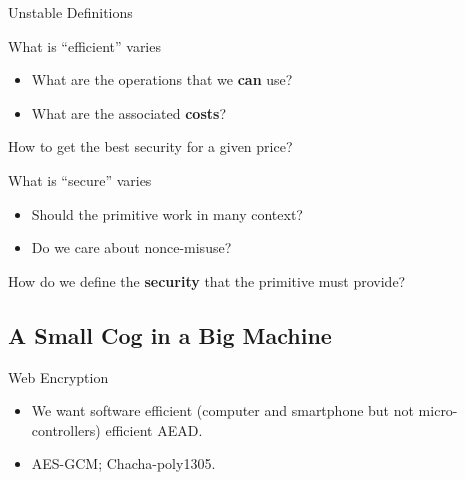\documentclass[presentation,aspectratio=1610]{beamer}
\begin{document}
\begin{frame}{Unstable Definitions}
  \begin{alertblock}{What is ``efficient'' varies}
    \begin{itemize}
    \item What are the operations that we \textbf{can} use?
    \item What are the associated \textbf{costs}? 
    \end{itemize}
    \begin{center}
      How to get the best security for a given price?
    \end{center}
  \end{alertblock}

  
  
  \begin{exampleblock}{What is ``secure'' varies}
    \begin{itemize}
    \item Should the primitive work in many context? \hfill{}
    \item Do we care about nonce-misuse? \hfill{}
    \end{itemize}
    \begin{center}
      How do we define the \textbf{security} that the primitive must provide?
    \end{center}
  \end{exampleblock}
\end{frame}


\subsection{A Small Cog in a Big Machine}


\begin{frame}{Web Encryption}
  \begin{center}

    \begin{itemize}
    \item<6-> We want \alert{software efficient} (computer and smartphone but not micro-controllers) efficient \alert{AEAD}.
    \item<7> AES-GCM; Chacha-poly1305.
    \end{itemize}
  \end{center}
\end{frame}
\end{document}
